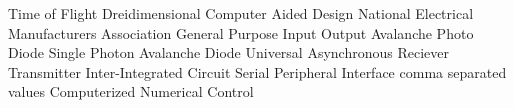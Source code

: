 
	{Time of Flight}
	{Dreidimensional}
	{Computer Aided Design}
	{National Electrical Manufacturers Association}
	{General Purpose Input Output}
	{Avalanche Photo Diode}
	{Single Photon Avalanche Diode}
 {Universal Asynchronous Reciever Transmitter}
	{Inter-Integrated Circuit}
	{Serial Peripheral Interface}
	{comma separated values}
	{Computerized Numerical Control}	